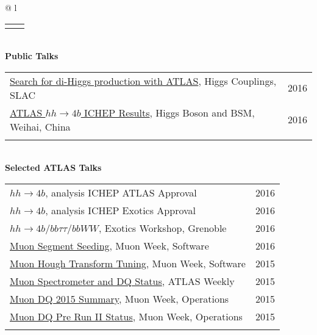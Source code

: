 \documentclass[letterpaper,11pt,oneside]{article}
\newcommand{\blue}[1]{\textcolor[rgb]{0,0,0.9}{#1}}
\begin{document}
\begin{flushleft}
\begin{tabular}{@{} l}
\begin{tabular}{@{} l l }
    \hspace{0.8\linewidth} & \hspace{0.1\linewidth} \\
     \end{tabular}
     \\
     \textbf{Public Talks} \\
     \begin{tabular}{@{} l l }
     \blue{\href{http://indico.cern.ch/event/477407/contributions/2295628/}{Search for di-Higgs production with ATLAS}}, Higgs Couplings, SLAC & 2016\\
     \blue{\href{http://indico.ihep.ac.cn/event/5635/session/86/contribution/40}{ATLAS $hh\to4b$ ICHEP Results}}, Higgs Boson and BSM, Weihai, China & 2016\\
    \hspace{0.8\linewidth} & \hspace{0.1\linewidth} \\
      \end{tabular}
     \\
     \textbf{Selected ATLAS Talks} \\
     \begin{tabular}{@{} l l }
     \blue{\href{https://indico.cern.ch/event/558982/contributions/2255258}{$hh\to4b$}}, analysis ICHEP ATLAS Approval & 2016\\
     \blue{\href{https://indico.cern.ch/event/556566/contributions/2244051}{$hh\to4b$}}, analysis ICHEP Exotics Approval & 2016\\
     \blue{\href{https://indico.cern.ch/event/465157/contributions/1972449}{$hh\to4b / bb\tau\tau / bbWW$}}, Exotics Workshop, Grenoble & 2016\\
      \blue{\href{https://indico.cern.ch/event/570115/contributions/2305843}{Muon Segment Seeding}}, Muon Week, Software & 2016\\
     \blue{\href{https://indico.cern.ch/event/465396/contributions/1984207}{Muon Hough Transform Tuning}}, Muon Week, Software & 2015\\
     \blue{\href{https://indico.cern.ch/event/444054/contributions/1099850}{Muon Spectrometer and DQ Status}}, ATLAS Weekly & 2015\\
     \blue{\href{https://indico.cern.ch/event/464848/contributions/1983327}{Muon DQ 2015 Summary}}, Muon Week, Operations & 2015\\
     \blue{\href{https://indico.cern.ch/event/376175/contributions/893495}{Muon DQ Pre Run II Status}}, Muon Week, Operations & 2015\\
     \hspace{0.8\linewidth} & \hspace{0.1\linewidth} \\
      \end{tabular}
      \end{tabular}
\end{flushleft}
\end{document}
